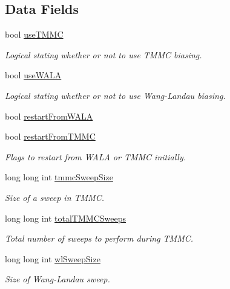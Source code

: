 \subsection*{Data Fields}
\begin{DoxyCompactItemize}
\item 
bool \hyperlink{classsim_system_aa474a50b6353c8897331b1ab1ce53ab1}{use\-T\-M\-M\-C}
\begin{DoxyCompactList}\small\item\em Logical stating whether or not to use T\-M\-M\-C biasing. \end{DoxyCompactList}\item 
bool \hyperlink{classsim_system_aa83b00006b3919fb6e13f1bdeadece6a}{use\-W\-A\-L\-A}
\begin{DoxyCompactList}\small\item\em Logical stating whether or not to use Wang-\/\-Landau biasing. \end{DoxyCompactList}\item 
bool \hyperlink{classsim_system_a2b168c89742f4d64270583e7e54b2929}{restart\-From\-W\-A\-L\-A}
\item 
bool \hyperlink{classsim_system_a0c81d3b606c070c801f8d86288e44391}{restart\-From\-T\-M\-M\-C}
\begin{DoxyCompactList}\small\item\em Flags to restart from W\-A\-L\-A or T\-M\-M\-C initially. \end{DoxyCompactList}\item 
long long int \hyperlink{classsim_system_a56e284a361964d0a9ce5c45f41d56ab1}{tmmc\-Sweep\-Size}
\begin{DoxyCompactList}\small\item\em Size of a sweep in T\-M\-M\-C. \end{DoxyCompactList}\item 
long long int \hyperlink{classsim_system_a78b107e20bcbf2f818264fa076de5db3}{total\-T\-M\-M\-C\-Sweeps}
\begin{DoxyCompactList}\small\item\em Total number of sweeps to perform during T\-M\-M\-C. \end{DoxyCompactList}\item 
long long int \hyperlink{classsim_system_ae625e1026daee4f99f83fb73881875a1}{wl\-Sweep\-Size}
\begin{DoxyCompactList}\small\item\em Size of Wang-\/\-Landau sweep. \end{DoxyCompactList}\item 

\end{DoxyCompactItemize}
